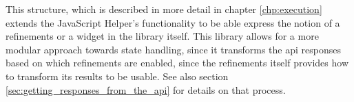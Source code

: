 This structure, which is described in more detail in chapter \ref{chp:execution} extends the JavaScript Helper's functionality to be able express the notion of a \glspl{refinement} or a widget in the library itself. This library allows for a more modular approach towards state handling, since it transforms the \acrshort{api} responses based on which \glspl{refinement} are enabled, since the \glspl{refinement} itself provides how to transform its results to be usable. See also section \ref{sec:getting_responses_from_the_api} for details on that process.


